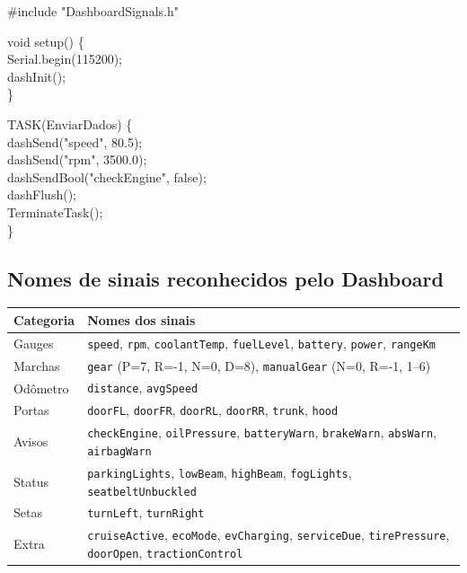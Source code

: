 \documentclass[12pt,a4paper]{article}
\begin{document}
\begin{codigobox}
\#include "DashboardSignals.h"

void setup() \{\\
\hspace*{2em}Serial.begin(115200);\\
\hspace*{2em}dashInit();\\
\}

TASK(EnviarDados) \{\\
\hspace*{2em}dashSend("speed", 80.5);\\
\hspace*{2em}dashSend("rpm", 3500.0);\\
\hspace*{2em}dashSendBool("checkEngine", false);\\
\hspace*{2em}dashFlush();\\
\hspace*{2em}TerminateTask();\\
\}
\end{codigobox}

\subsection{Nomes de sinais reconhecidos pelo Dashboard}

\begin{center}
\small
\begin{tabularx}{\textwidth}{lX}
  \toprule
  \textbf{Categoria} & \textbf{Nomes dos sinais} \\
  \midrule
  Gauges & \texttt{speed}, \texttt{rpm}, \texttt{coolantTemp}, \texttt{fuelLevel}, \texttt{battery}, \texttt{power}, \texttt{rangeKm} \\
  Marchas & \texttt{gear} (P=7, R=-1, N=0, D=8), \texttt{manualGear} (N=0, R=-1, 1--6) \\
  Odômetro & \texttt{distance}, \texttt{avgSpeed} \\
  Portas & \texttt{doorFL}, \texttt{doorFR}, \texttt{doorRL}, \texttt{doorRR}, \texttt{trunk}, \texttt{hood} \\
  Avisos & \texttt{checkEngine}, \texttt{oilPressure}, \texttt{batteryWarn}, \texttt{brakeWarn}, \texttt{absWarn}, \texttt{airbagWarn} \\
  Status & \texttt{parkingLights}, \texttt{lowBeam}, \texttt{highBeam}, \texttt{fogLights}, \texttt{seatbeltUnbuckled} \\
  Setas & \texttt{turnLeft}, \texttt{turnRight} \\
  Extra & \texttt{cruiseActive}, \texttt{ecoMode}, \texttt{evCharging}, \texttt{serviceDue}, \texttt{tirePressure}, \texttt{doorOpen}, \texttt{tractionControl} \\
  \bottomrule
\end{tabularx}
\end{center}
\end{document}
